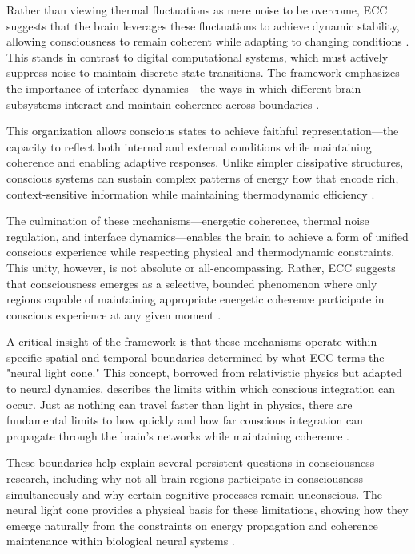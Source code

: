Rather than viewing thermal fluctuations as mere noise to be overcome, ECC suggests that the brain leverages these fluctuations to achieve dynamic stability, allowing consciousness to remain coherent while adapting to changing conditions \cite{singer2018neuronal}. This stands in contrast to digital computational systems, which must actively suppress noise to maintain discrete state transitions. The framework emphasizes the importance of interface dynamics—the ways in which different brain subsystems interact and maintain coherence across boundaries \cite{sporns2011networks}.

This organization allows conscious states to achieve faithful representation—the capacity to reflect both internal and external conditions while maintaining coherence and enabling adaptive responses. Unlike simpler dissipative structures, conscious systems can sustain complex patterns of energy flow that encode rich, context-sensitive information while maintaining thermodynamic efficiency \cite{fries2015rhythms}.

The culmination of these mechanisms—energetic coherence, thermal noise regulation, and interface dynamics—enables the brain to achieve a form of unified conscious experience while respecting physical and thermodynamic constraints. This unity, however, is not absolute or all-encompassing. Rather, ECC suggests that consciousness emerges as a selective, bounded phenomenon where only regions capable of maintaining appropriate energetic coherence participate in conscious experience at any given moment \cite{tononi2015consciousness2dup}.

A critical insight of the framework is that these mechanisms operate within specific spatial and temporal boundaries determined by what ECC terms the "neural light cone." This concept, borrowed from relativistic physics but adapted to neural dynamics, describes the limits within which conscious integration can occur. Just as nothing can travel faster than light in physics, there are fundamental limits to how quickly and how far conscious integration can propagate through the brain's networks while maintaining coherence \cite{von2010dynamic}.

These boundaries help explain several persistent questions in consciousness research, including why not all brain regions participate in consciousness simultaneously and why certain cognitive processes remain unconscious. The neural light cone provides a physical basis for these limitations, showing how they emerge naturally from the constraints on energy propagation and coherence maintenance within biological neural systems \cite{atasoy2016human}.


